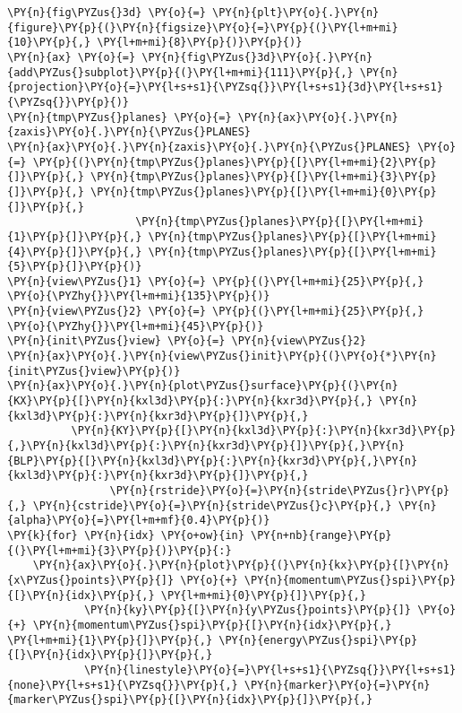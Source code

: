 \begin{Verbatim}[commandchars=\\\{\}]
\PY{n}{fig\PYZus{}3d} \PY{o}{=} \PY{n}{plt}\PY{o}{.}\PY{n}{figure}\PY{p}{(}\PY{n}{figsize}\PY{o}{=}\PY{p}{(}\PY{l+m+mi}{10}\PY{p}{,} \PY{l+m+mi}{8}\PY{p}{)}\PY{p}{)}
\PY{n}{ax} \PY{o}{=} \PY{n}{fig\PYZus{}3d}\PY{o}{.}\PY{n}{add\PYZus{}subplot}\PY{p}{(}\PY{l+m+mi}{111}\PY{p}{,} \PY{n}{projection}\PY{o}{=}\PY{l+s+s1}{\PYZsq{}}\PY{l+s+s1}{3d}\PY{l+s+s1}{\PYZsq{}}\PY{p}{)}
\PY{n}{tmp\PYZus{}planes} \PY{o}{=} \PY{n}{ax}\PY{o}{.}\PY{n}{zaxis}\PY{o}{.}\PY{n}{\PYZus{}PLANES}
\PY{n}{ax}\PY{o}{.}\PY{n}{zaxis}\PY{o}{.}\PY{n}{\PYZus{}PLANES} \PY{o}{=} \PY{p}{(}\PY{n}{tmp\PYZus{}planes}\PY{p}{[}\PY{l+m+mi}{2}\PY{p}{]}\PY{p}{,} \PY{n}{tmp\PYZus{}planes}\PY{p}{[}\PY{l+m+mi}{3}\PY{p}{]}\PY{p}{,} \PY{n}{tmp\PYZus{}planes}\PY{p}{[}\PY{l+m+mi}{0}\PY{p}{]}\PY{p}{,}
                    \PY{n}{tmp\PYZus{}planes}\PY{p}{[}\PY{l+m+mi}{1}\PY{p}{]}\PY{p}{,} \PY{n}{tmp\PYZus{}planes}\PY{p}{[}\PY{l+m+mi}{4}\PY{p}{]}\PY{p}{,} \PY{n}{tmp\PYZus{}planes}\PY{p}{[}\PY{l+m+mi}{5}\PY{p}{]}\PY{p}{)}
\PY{n}{view\PYZus{}1} \PY{o}{=} \PY{p}{(}\PY{l+m+mi}{25}\PY{p}{,} \PY{o}{\PYZhy{}}\PY{l+m+mi}{135}\PY{p}{)}
\PY{n}{view\PYZus{}2} \PY{o}{=} \PY{p}{(}\PY{l+m+mi}{25}\PY{p}{,} \PY{o}{\PYZhy{}}\PY{l+m+mi}{45}\PY{p}{)}
\PY{n}{init\PYZus{}view} \PY{o}{=} \PY{n}{view\PYZus{}2}
\PY{n}{ax}\PY{o}{.}\PY{n}{view\PYZus{}init}\PY{p}{(}\PY{o}{*}\PY{n}{init\PYZus{}view}\PY{p}{)}
\PY{n}{ax}\PY{o}{.}\PY{n}{plot\PYZus{}surface}\PY{p}{(}\PY{n}{KX}\PY{p}{[}\PY{n}{kxl3d}\PY{p}{:}\PY{n}{kxr3d}\PY{p}{,} \PY{n}{kxl3d}\PY{p}{:}\PY{n}{kxr3d}\PY{p}{]}\PY{p}{,}
          \PY{n}{KY}\PY{p}{[}\PY{n}{kxl3d}\PY{p}{:}\PY{n}{kxr3d}\PY{p}{,}\PY{n}{kxl3d}\PY{p}{:}\PY{n}{kxr3d}\PY{p}{]}\PY{p}{,}\PY{n}{BLP}\PY{p}{[}\PY{n}{kxl3d}\PY{p}{:}\PY{n}{kxr3d}\PY{p}{,}\PY{n}{kxl3d}\PY{p}{:}\PY{n}{kxr3d}\PY{p}{]}\PY{p}{,}
                \PY{n}{rstride}\PY{o}{=}\PY{n}{stride\PYZus{}r}\PY{p}{,} \PY{n}{cstride}\PY{o}{=}\PY{n}{stride\PYZus{}c}\PY{p}{,} \PY{n}{alpha}\PY{o}{=}\PY{l+m+mf}{0.4}\PY{p}{)}
\PY{k}{for} \PY{n}{idx} \PY{o+ow}{in} \PY{n+nb}{range}\PY{p}{(}\PY{l+m+mi}{3}\PY{p}{)}\PY{p}{:}
    \PY{n}{ax}\PY{o}{.}\PY{n}{plot}\PY{p}{(}\PY{n}{kx}\PY{p}{[}\PY{n}{x\PYZus{}points}\PY{p}{]} \PY{o}{+} \PY{n}{momentum\PYZus{}spi}\PY{p}{[}\PY{n}{idx}\PY{p}{,} \PY{l+m+mi}{0}\PY{p}{]}\PY{p}{,}
            \PY{n}{ky}\PY{p}{[}\PY{n}{y\PYZus{}points}\PY{p}{]} \PY{o}{+} \PY{n}{momentum\PYZus{}spi}\PY{p}{[}\PY{n}{idx}\PY{p}{,} \PY{l+m+mi}{1}\PY{p}{]}\PY{p}{,} \PY{n}{energy\PYZus{}spi}\PY{p}{[}\PY{n}{idx}\PY{p}{]}\PY{p}{,}
            \PY{n}{linestyle}\PY{o}{=}\PY{l+s+s1}{\PYZsq{}}\PY{l+s+s1}{none}\PY{l+s+s1}{\PYZsq{}}\PY{p}{,} \PY{n}{marker}\PY{o}{=}\PY{n}{marker\PYZus{}spi}\PY{p}{[}\PY{n}{idx}\PY{p}{]}\PY{p}{,}

\end{Verbatim}
